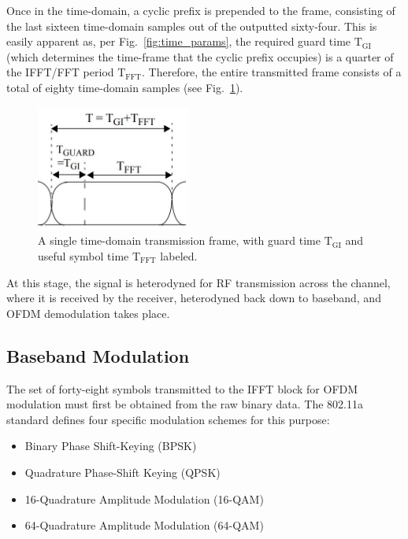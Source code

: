 \documentclass[journal]{IEEEtran}
\begin{document}
Once in the time-domain, a cyclic prefix is prepended to the frame, consisting of the last sixteen time-domain samples out of the outputted sixty-four. This is easily apparent as, per Fig.~\ref{fig:time_params}, the required guard time $\text{T}_\text{GI}$ (which determines the time-frame that the cyclic prefix occupies) is a quarter of the IFFT/FFT period $\text{T}_\text{FFT}$. Therefore, the entire transmitted frame consists of a total of eighty time-domain samples (see Fig.~\ref{fig:Frame}).
\begin{figure}
    \centering
    \includegraphics[width = 0.45\textwidth]{Frame}
    \caption{A single time-domain transmission frame, with guard time $\text{T}_\text{GI}$ and useful symbol time $\text{T}_\text{FFT}$ labeled.}
    \label{fig:Frame}
\end{figure}

At this stage, the signal is heterodyned for RF transmission across the channel, where it is received by the receiver, heterodyned back down to baseband, and OFDM demodulation takes place.

\subsection{Baseband Modulation} \label{sec:Modulation}
The set of forty-eight symbols transmitted to the IFFT block for OFDM modulation must first be obtained from the raw binary data.  The 802.11a standard defines four specific modulation schemes for this purpose:
\begin{itemize}
\item Binary Phase Shift-Keying (BPSK)
\item Quadrature Phase-Shift Keying (QPSK)
\item 16-Quadrature Amplitude Modulation (16-QAM)
\item 64-Quadrature Amplitude Modulation (64-QAM)
\end{itemize}
\end{document}
